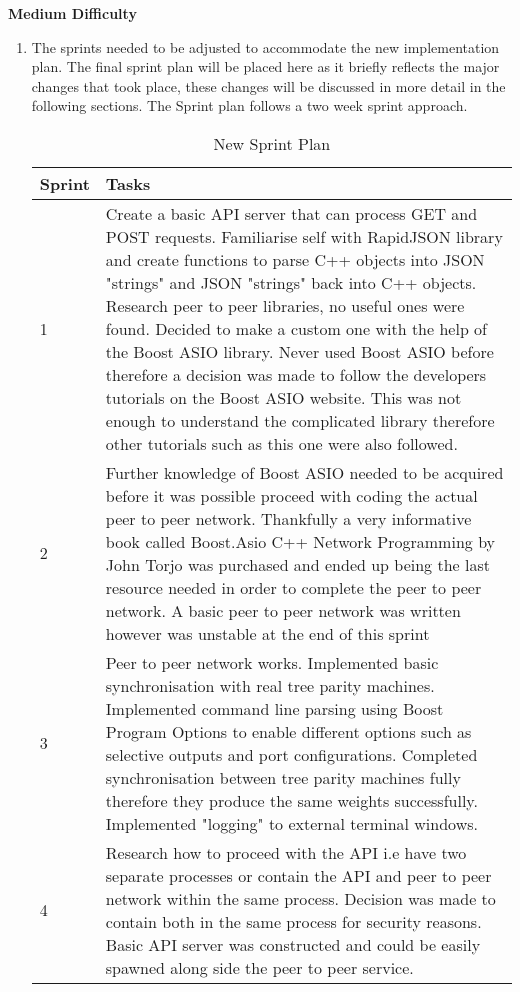 \textbf{Medium Difficulty}
\begin{enumerate}
\item The sprints needed to be adjusted to accommodate the new implementation plan. The final sprint plan will be placed here as it briefly reflects the major changes that took place, these changes will be discussed in more detail in the following sections. The Sprint plan follows a two week sprint approach.
\begin{table}[h]
\centering
\caption{New Sprint Plan}
\begin{tabular}{|p{1cm}|p{12cm}|}
\hline Sprint & Tasks \\ [14pt]

\hline 1 & Create a basic API server that can process GET and POST requests. Familiarise self with RapidJSON library \cite{rapidjson} and create functions to parse C++ objects into JSON "strings" and JSON "strings" back into C++ objects. Research peer to peer libraries, no useful ones were found. Decided to make a custom one with the help of the Boost ASIO \cite{boost_asio_home} library. Never used Boost ASIO before therefore a decision was made to follow the developers tutorials on the Boost ASIO website. This was not enough to understand the complicated library therefore other tutorials such as this one \cite{boost_asio_totorial_1} were also followed.  \\ [12pt]

\hline 2 & Further knowledge of Boost ASIO needed to be acquired before it was possible proceed with coding the actual peer to peer network. Thankfully a very informative book called Boost.Asio C++ Network Programming \cite{boost_book} by John Torjo was purchased and ended up being the last resource needed in order to complete the peer to peer network. A basic peer to peer network was written however was unstable at the end of this sprint \\ [12pt]

\hline 3 & Peer to peer network works. Implemented basic synchronisation with real tree parity machines. Implemented command line parsing using Boost Program Options \cite{boost_asio_cmd} to enable different options such as selective outputs and port configurations. Completed synchronisation between tree parity machines fully therefore they produce the same weights successfully. Implemented "logging" to external terminal windows. \\ [12pt]

\hline 4 & Research how to proceed with the API i.e have two separate processes or contain the API and peer to peer network within the same process. Decision was made to contain both in the same process for security reasons. Basic API server was constructed and could be easily spawned along side the peer to peer service.\\ [12pt]


\end{tabular}
\end{table}
\end{enumerate}
